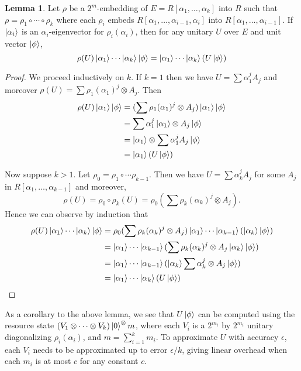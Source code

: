 \documentclass{article}
\theoremstyle{definition}
\theoremstyle{theorem}
\newtheorem{lemma}{Lemma}
\theoremstyle{remark}
\begin{document}
\begin{lemma}\label{lem:resource}
Let $\rho$ be a $2^m$-embedding of $E=R[\alpha_1,\dots,\alpha_{k}]$ into $R$ such that $\rho=\rho_1\circ\cdots\circ\rho_k$ where each $\rho_i$ embeds $R[\alpha_1,\dots,\alpha_{i-1},\alpha_{i}]$ into $R[\alpha_1,\dots,\alpha_{i-1}]$. If $\ket{\alpha_i}$ is an $\alpha_i$-eigenvector for $\rho_i(\alpha_i)$, then for any unitary $U$ over $E$ and unit vector $\ket{\phi}$,
\[
	\rho(U)\ket{\alpha_1}\cdots\ket{\alpha_k}\ket{\phi} = \ket{\alpha_1}\cdots\ket{\alpha_k}(U\ket{\phi})
\]
\end{lemma}
\begin{proof}
We proceed inductively on $k$. If $k=1$ then we have $U = \sum \alpha_1^j A_{j}$ and moreover $\rho(U)=\sum\rho_1(\alpha_1)^j\otimes A_j$. Then
\begin{align*}
	\rho(U)\ket{\alpha_1}\ket{\phi}
		&=(\sum\rho_1(\alpha_1)^j\otimes A_j)\ket{\alpha_1}\ket{\phi} \\
		&=\sum \alpha_1^j\ket{\alpha_1}\otimes A_j\ket{\phi} \\
		&=\ket{\alpha_1}\otimes \sum \alpha_1^j A_j\ket{\phi} \\
		&=\ket{\alpha_1}(U\ket{\phi})
\end{align*}

Now suppose $k>1$. Let $\rho_0=\rho_1\circ\cdots\rho_{k-1}$. Then we have $U = \sum \alpha_k^j A_{j}$ for some $A_{j}$ in $R[\alpha_1,\dots,\alpha_{k-1}]$ and moreover, 
\[ 
	\rho(U)=\rho_0\circ\rho_k(U) = \rho_0(\sum\rho_k(\alpha_k)^j\otimes A_j).
\]
Hence we can observe by induction that
\begin{align*}
	\rho(U)\ket{\alpha_1}\cdots\ket{\alpha_k}\ket{\phi}
		&= \rho_0(\sum\rho_k(\alpha_k)^j\otimes A_j)\ket{\alpha_1}\cdots\ket{\alpha_{k-1}}(\ket{\alpha_k}\ket{\phi}) \\
		&= \ket{\alpha_1}\cdots\ket{\alpha_{k-1}}(\sum\rho_k(\alpha_k)^j\otimes A_j\ket{\alpha_k}\ket{\phi}) \\
		&=\ket{\alpha_1}\cdots\ket{\alpha_{k-1}}(\ket{\alpha_k}\sum\alpha_k^j\otimes A_j\ket{\phi}) \\
		&=\ket{\alpha_1}\cdots\ket{\alpha_k}(U\ket{\phi})
\end{align*}
\end{proof}

As a corollary to the above lemma, we see that $U\ket{\phi}$ can be computed using the resource state $(V_1\otimes\cdots\otimes V_k)\ket{0}^\otimes m$, where each $V_i$ is a $2^{m_i}$ by $2^{m_i}$ unitary diagonalizing $\rho_i(\alpha_i)$, and $m = \sum_{i=1}^k m_i$. To approximate $U$ with accuracy $\epsilon$, each $V_i$ needs to be approximated up to error $\epsilon/k$, giving linear overhead when each $m_i$ is at most $c$ for any constant $c$.
\end{document}
